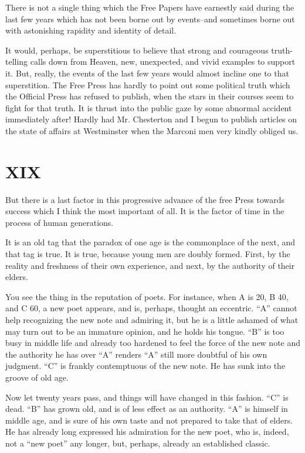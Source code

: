 \documentclass{book}
\begin{document}
There is not a single thing which the Free Papers have earnestly said during the last few years which has not been borne out by events–and sometimes borne out with astonishing rapidity and identity of detail.

It would, perhaps, be superstitious to believe that strong and courageous truth-telling calls down from Heaven, new, unexpected, and vivid examples to support it. But, really, the events of the last few years would almost incline one to that superstition. The Free Press has hardly to point out some political truth which the Official Press has refused to publish, when the stars in their courses seem to fight for that truth. It is thrust into the public gaze by some abnormal accident immediately after! Hardly had Mr. Chesterton and I begun to publish articles on the state of affairs at Westminster when the Marconi men very kindly obliged us.

\chapter*{XIX}
\label{chapter-20}
But there is a last factor in this progressive advance of the free Press towards success which I think the most important of all. It is the factor of time in the process of human generations.

It is an old tag that the paradox of one age is the commonplace of the next, and that tag is true. It is true, because young men are doubly formed. First, by the reality and freshness of their own experience, and next, by the authority of their elders.

You see the thing in the reputation of poets. For instance, when A is 20, B 40, and C 60, a new poet appears, and is, perhaps, thought an eccentric. “A” cannot help recognizing the new note and admiring it, but he is a little ashamed of what may turn out to be an immature opinion, and he holds his tongue. “B” is too busy in middle life and already too hardened to feel the force of the new note and the authority he has over “A” renders “A” still more doubtful of his own judgment. “C” is frankly contemptuous of the new note. He has sunk into the groove of old age.

Now let twenty years pass, and things will have changed in this fashion. “C” is dead. “B” has grown old, and is of less effect as an authority. “A” is himself in middle age, and is sure of his own taste and not prepared to take that of elders. He has already long expressed his admiration for the new poet, who is, indeed, not a “new poet” any longer, but, perhaps, already an established classic.
\end{document}
